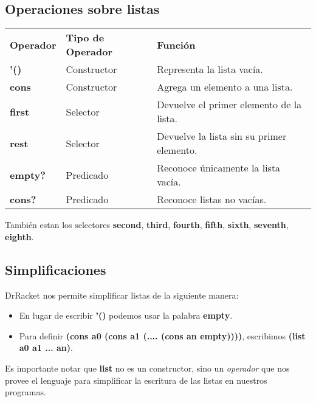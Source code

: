 \documentclass[11pt,a4paper]{article}
\begin{document}
\subsection{Operaciones sobre listas}
\begin{table}[h]
\centering
\begin{tabular}{lll}
\textbf{Operador} & \textbf{Tipo de Operador} & \textbf{Funci\'on}\\
\textbf{'()} & Constructor & Representa la lista vacía. \\
\textbf{cons} & Constructor & Agrega un elemento a una lista. \\
\textbf{first} & Selector & Devuelve el primer elemento de la lista. \\
\textbf{rest} & Selector & Devuelve la lista sin su primer elemento. \\
\textbf{empty?} & Predicado & Reconoce únicamente la lista vacía. \\
\textbf{cons?} & Predicado & Reconoce listas no vacías.
\end{tabular}
\end{table}
Tambi\'en estan los selectores \textbf{second}, \textbf{third}, \textbf{fourth}, \textbf{fifth}, \textbf{sixth}, \textbf{seventh}, \textbf{eighth}.
\subsection{Simplificaciones}
DrRacket nos permite simplificar listas de la siguiente manera:
\begin{itemize}
\item En lugar de escribir \textbf{'()} podemos usar la palabra \textbf{empty}.

\item Para definir \textbf{(cons a0 (cons a1 (.... (cons an empty))))}, escribimos \textbf{(list a0 a1 ... an)}.
\end{itemize}
Es importante notar que \textbf{list} no es un constructor, sino un \textit{operador} que nos provee el lenguaje para simplificar la escritura de las listas en nuestros programas.
\end{document}
